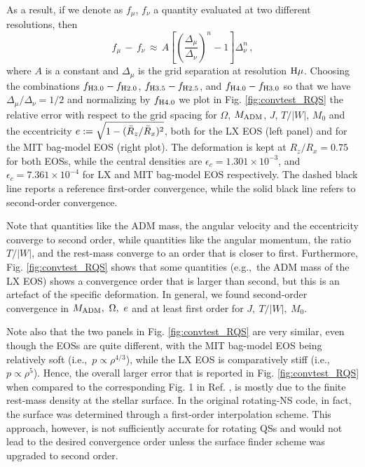 \documentclass[twocolumn,superscriptaddress,showpacs,prd,aps,amsmath,amssymb,nofootinbib]{revtex4-1}
\newcommand{\ie}{i.e.,~}
\newcommand{\eg}{e.g.,~}
\begin{document}
As a result, if we denote as $f_{\mu}$, $f_{\nu}$ a quantity evaluated at
two different resolutions, then
\begin{equation}
f_{\mu}\,-\,f_{\nu} \, \approx \,
A\left[ \left(\frac{\Delta_\mu}{\Delta_\nu}\right)^n-1 \right] 
\Delta^n_\nu\,,
\label{eq:convtest}
\end{equation}
where $A$ is a constant and $\Delta_\mu$ is the grid separation at
resolution ${\rm H}\mu$. Choosing the combinations $f_{{\rm
    H}3.0}-f_{{\rm H}2.0}$, $f_{{\rm H}3.5}-f_{{\rm H}2.5}$, and $f_{{\rm
    H}4.0}-f_{{\rm H}3.0}$ so that we have $\Delta_{\mu} /
\Delta_{\nu}=1/2$ and normalizing by $f_{{\rm H}4.0}$ we plot in
Fig. \ref{fig:convtest_RQS} the relative error with respect to the grid
spacing for $\Omega$, $M_{\rm ADM}$, $J$, $T/|W|$, $M_0$ and the eccentricity
$e:=\sqrt{1-({\bar R}_z/{\bar R}_x)^2}$, both for the LX EOS (left panel) and for
the MIT bag-model EOS (right plot). The deformation is kept at
$R_z/R_x=0.75$ for both EOSs, while the central densities are
$\epsilon_c=1.301\times10^{-3}$, and $\epsilon_c = 7.361\times10^{-4}$
for LX and MIT bag-model EOS respectively. The dashed black line reports
a reference first-order convergence, while the solid black line refers to
second-order convergence.

Note that quantities like the ADM mass, the angular velocity and the
eccentricity converge to second order, while quantities like the angular
momentum, the ratio $T/|W|$, and the rest-mass converge to an order that
is closer to first. Furthermore, Fig. \ref{fig:convtest_RQS} shows that
some quantities (\eg the ADM
mass of the LX EOS) shows a convergence order that is larger than 
second, 
but this is an artefact of the specific deformation. In
general, we found second-order convergence in $M_{\rm ADM},\ \Omega,\ e$
and at least first order for $J,\ T/|W|,\ M_0$. 

Note also that the two panels in Fig. \ref{fig:convtest_RQS} are very
similar, even though the EOSs are quite different, with the MIT bag-model
EOS being relatively soft (\ie $p\propto \rho^{4/3}$), while the LX EOS
is comparatively stiff (\ie $p\propto \rho^5$). Hence, the overall larger
error that is reported in Fig. \ref{fig:convtest_RQS} when compared to
the corresponding Fig. 1 in Ref. \cite{Huang08}, is mostly due to the
finite rest-mass density at the stellar surface. In the original
rotating-NS code, in fact, the surface was determined through a
first-order interpolation scheme. This approach, however, is not
sufficiently accurate for rotating QSs and would not lead to the desired
convergence order unless the surface finder scheme was upgraded to second
order.
\end{document}
